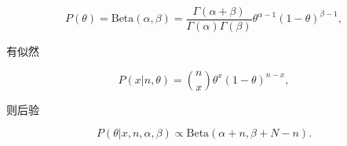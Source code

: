 \documentclass{article}
\begin{document}
\begin{equation}
    P(\theta)=\text{Beta}(\alpha,\beta)=\frac{\Gamma(\alpha+\beta)}{\Gamma(\alpha)\Gamma(\beta)}\theta^{\alpha-1}(1-\theta)^{\beta-1},
\end{equation}

有似然

\begin{equation}
    P(x|n,\theta)=\binom{n}{x}\theta^x(1-\theta)^{n-x},
\end{equation}

则后验

\begin{equation}
    P(\theta|x,n,\alpha,\beta)\propto\text{Beta}(\alpha+n,\beta+N-n).
\end{equation}
\end{document}
